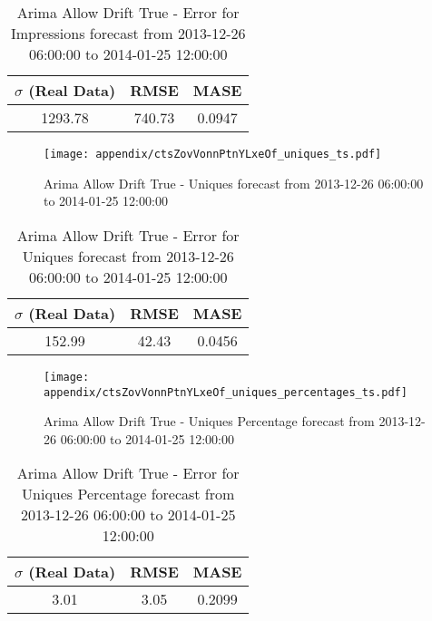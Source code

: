 \begin{table}[H]
\centering
\footnotesize
\begin{tabular}{ccc}
$\sigma$ (Real Data) & RMSE & MASE   \\ \hline
1293.78 & 740.73 & 0.0947 \\
\end{tabular}

\vspace{0.5cm}

\caption{
Arima Allow Drift True - Error for Impressions forecast from 2013-12-26 06:00:00 to 2014-01-25 12:00:00}
\end{table}

\begin{figure}[H] \begin{center} \leavevmode
\texttt{[image: appendix/ctsZovVonnPtnYLxeOf\_uniques\_ts.pdf]} \caption{
Arima Allow Drift True - Uniques forecast from 2013-12-26 06:00:00 to 2014-01-25 12:00:00} \label{fig:appendix/ctsZovVonnPtnYLxeOf_uniques_ts.pdf} \end{center}
\end{figure}

\begin{table}[H]
\centering
\footnotesize
\begin{tabular}{ccc}
$\sigma$ (Real Data) & RMSE & MASE   \\ \hline
152.99 & 42.43 & 0.0456 \\
\end{tabular}

\vspace{0.5cm}

\caption{
Arima Allow Drift True - Error for Uniques forecast from 2013-12-26 06:00:00 to 2014-01-25 12:00:00}
\end{table}

\begin{figure}[H] \begin{center} \leavevmode
\texttt{[image: appendix/ctsZovVonnPtnYLxeOf\_uniques\_percentages\_ts.pdf]} \caption{
Arima Allow Drift True - Uniques Percentage forecast from 2013-12-26 06:00:00 to 2014-01-25 12:00:00} \label{fig:appendix/ctsZovVonnPtnYLxeOf_uniques_percentages_ts.pdf} \end{center}
\end{figure}

\begin{table}[H]
\centering
\footnotesize
\begin{tabular}{ccc}
$\sigma$ (Real Data) & RMSE & MASE   \\ \hline
3.01 & 3.05 & 0.2099 \\
\end{tabular}

\vspace{0.5cm}

\caption{
Arima Allow Drift True - Error for Uniques Percentage forecast from 2013-12-26 06:00:00 to 2014-01-25 12:00:00}
\end{table}

